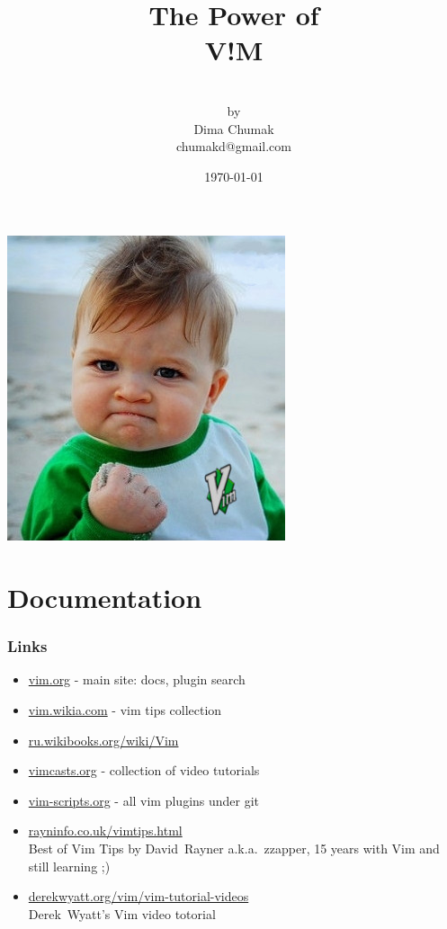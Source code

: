 \documentclass[14pt,svgnames,compress]{beamer}
\title{\Large{The Power of} \\ \titlefontsize\textbf{V!M}}
\author{
    \\
    \vspace{.4cm}
    \footnotesize by \\
    \medskip  Dima Chumak \\
    chumakd@gmail.com
}
\date{\footnotesize\today}
\begin{document}
\begin{frame}
    \titlepage
\end{frame}

\begin{frame}[plain]
    \begin{center}
        \includegraphics{figures/success_vim.jpg}
    \end{center}
\end{frame}


\section{Documentation}

\begin{frame}
    \frametitle{Links}
    \begin{itemize}
        \item \href{http://www.vim.org}
                   {vim.org} - main site: docs, plugin search
        \item \href{http://vim.wikia.com}
                   {vim.wikia.com} - vim tips collection
        \item \href{http://ru.wikibooks.org/wiki/Vim}
                   {ru.wikibooks.org/wiki/Vim}
        \item \href{http://vimcasts.org/episodes/archive}
                   {vimcasts.org} - collection of video tutorials
        \item \href{http://vim-scripts.org}
                   {vim-scripts.org} - all vim plugins under git
        \item \href{http://rayninfo.co.uk/vimtips.html}
                   {rayninfo.co.uk/vimtips.html} \\
                   Best of Vim Tips by David~Rayner {\footnotesize
                   a.k.a.}~zzapper, {\footnotesize 15 years with Vim and still
                   learning ;)}
        \item \href{http://www.derekwyatt.org/vim/vim-tutorial-videos/}
                   {derekwyatt.org/vim/vim-tutorial-videos} \\
                   Derek~Wyatt's Vim video totorial
    \end{itemize}
\end{frame}
\end{document}
